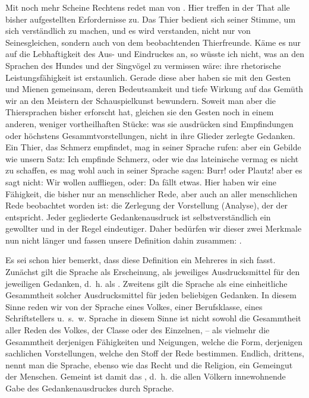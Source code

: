 Mit noch mehr Scheine Rechtens redet man von . Hier treffen in der That alle bisher aufgestellten Erfordernisse zu. Das Thier bedient sich seiner Stimme, um sich verständlich zu machen, \label{sp.3} und es wird verstanden, nicht nur von Seinesgleichen, sondern auch von dem beobachtenden Thierfreunde. Käme es nur auf die Lebhaftigkeit des Aus- und Eindruckes an, so wüsste ich nicht, was an den Sprachen des Hundes und der Singvögel zu vermissen wäre: ihre rhetorische Leistungsfähigkeit ist erstaunlich. Gerade diese aber haben sie mit den Gesten und Mienen gemeinsam, deren Bedeutsamkeit und tiefe Wirkung auf das Gemüth wir an den Meistern der Schauspielkunst bewundern. Soweit man aber die Thiersprachen bisher erforscht hat, gleichen sie den Gesten noch in einem anderen, weniger vortheilhaften Stücke: was sie ausdrücken sind Empfindungen oder höchstens Gesammtvorstellungen, nicht in ihre Glieder zerlegte Gedanken. Ein Thier, das Schmerz empfindet, mag in seiner Sprache rufen:  aber ein Gebilde wie unsern Satz: Ich empfinde Schmerz, oder wie das lateinische  vermag es nicht zu schaffen, es mag wohl auch in seiner Sprache sagen: Burr! oder Plautz! aber es sagt nicht: Wir wollen auffliegen, oder: Da fällt etwas. Hier haben wir eine Fähigkeit, die bisher nur an menschlicher Rede, aber auch an aller menschlichen Rede beobachtet worden ist: die Zerlegung der Vorstellung (Analyse), der der  entspricht. Jeder gegliederte Gedankenausdruck ist selbstverständlich ein gewollter und in der Regel eindeutiger. Daher bedürfen wir dieser zwei Merkmale nun nicht länger und fassen unsere Definition dahin zusammen: .

Es sei schon hier bemerkt, dass diese Definition ein Mehreres in sich fasst. Zunächst gilt die Sprache als Erscheinung, als jeweiliges Ausdrucksmittel für den jeweiligen Gedanken, d.~h. als . Zweitens gilt die Sprache als eine einheitliche Gesammtheit solcher Ausdrucksmittel für jeden beliebigen Gedanken. In diesem Sinne reden wir von der Sprache eines Volkes, einer Berufsklasse, eines Schriftstellers u.~s.~w. \label{fp.4} Sprache in diesem Sinne ist nicht sowohl die Gesammtheit aller Reden des Volkes, der Classe oder des Einzelnen, – als vielmehr die Gesammtheit derjenigen Fähigkeiten und Neigungen, welche die Form, derjenigen sachlichen Vorstellungen, welche den Stoff der Rede bestimmen. Endlich, drittens, nennt man die Sprache, ebenso wie das Recht und die Religion, ein Gemeingut der Menschen. Gemeint ist damit das , d.~h. die allen Völkern innewohnende Gabe des Gedankenausdruckes durch Sprache.

